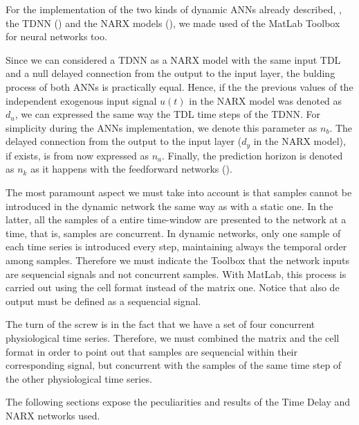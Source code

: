
\label{sec:application:tdnn}

For the implementation of the two kinds of dynamic ANNs already
described,
\ie, the TDNN () and the NARX models (), 
we made used of the MatLab Toolbox for neural networks too. 

Since we can considered a TDNN as a NARX model with the same input TDL 
and a null delayed connection from the output to the input layer, 
the bulding process of both ANNs is practically equal. Hence, if the the previous values of the independent exogenous input signal $u(t)$ in the NARX model was denoted as $d_{u}$, we can expressed the same way the TDL time steps of the TDNN. For simplicity during the ANNs implementation, we denote this parameter as $n_{b}$. The delayed connection from the output to the input layer ($d_{y}$ in the NARX model), if exists, is from now expressed as $n_{a}$. 
Finally, the prediction horizon is denoted as $n_{k}$ as it happens with the feedforward networks ().

The most paramount aspect we must take into account is that samples cannot be introduced in the dynamic network the same way as with a static one. 
In the latter, all the samples of a entire time-window are presented to the network at a time, that is, samples are concurrent. 
In dynamic networks, only one sample of each time series is introduced every step, maintaining always the temporal order among samples. Therefore we must indicate the Toolbox that the network inputs are sequencial signals and not concurrent samples. With MatLab, this process is carried out using the cell format instead of the matrix one. Notice that also de output must be defined as a sequencial signal.

The turn of the screw is in the fact that we have a set of four concurrent physiological time series. Therefore, we must combined the matrix and the cell format in order to point out that samples are sequencial within their corresponding signal, but concurrent with the samples of the same time step of the other physiological time series.

The following sections expose the peculiarities and results of the Time Delay and NARX networks used.





